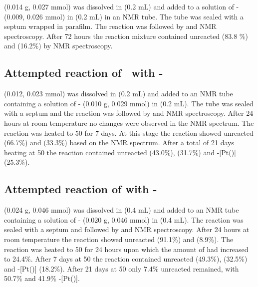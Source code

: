 \tButhixantphos{} (0.014 g, 0.027 mmol) was dissolved in  (0.2 mL) and added to a solution of \cis- (0.009, 0.026 mmol) in  (0.2 mL) in an NMR tube.  The tube was sealed with a septum wrapped in parafilm.  The reaction was followed by \proton{} and \phosphorus{} NMR spectroscopy.  After 72 hours the reaction mixture contained unreacted \tButhixantphos{} (83.8 \%) and \tButhixantphos{}  (16.2\%) by \phosphorus{} NMR spectroscopy.  

\subsection*{Attempted reaction of \tButhixantphos\ with \trans-}

\tButhixantphos{} (0.012, 0.023 mmol) was dissolved in  (0.2 mL) and added to an NMR tube containing a solution of \trans- (0.010 g, 0.029 mmol) in  (0.2 mL). The tube was sealed with a septum and the reaction was followed by \proton{} and \phosphorus{} NMR spectroscopy.  After 24 hours at room temperature no changes were observed in the NMR spectrum.  The reaction was heated to 50 \degC for 7 days.  At this stage the reaction showed unreacted \tButhixantphos{} (66.7\%) and \tButhixantphos{} (33.3\%) based on the \phosphorus{} NMR spectrum.  After a total of 21 days heating at 50 \degC the reaction contained unreacted \tButhixantphos{} (43.0\%), \tButhixantphos{} (31.7\%) and \trans-[Pt(\tButhixantphos)] (25.3\%).  

\subsection*{Attempted reaction of \tButhixantphos with \trans-\ce{[Pt(CN^{t}Bu)2Cl2]}}

\tButhixantphos{} (0.024 g, 0.046 mmol) was dissolved in  (0.4 mL) and added to an NMR tube containing a solution of \trans- (0.020 g, 0.046 mmol) in  (0.4 mL).  The reaction was sealed with a septum and followed by \proton{} and \phosphorus{} NMR spectroscopy.  After 24 hours at room temperature the reaction showed unreacted \tButhixantphos{} (91.1\%) and \tButhixantphos{} (8.9\%).  The reaction was heated to 50 \degC{} for 24 hours upon which the amount of \tButhixantphos{} had increased to 24.4\%.  After 7 days at 50 \degC the reaction contained unreacted \tButhixantphos{} (49.3\%), \tButhixantphos{} (32.5\%) and \trans-[Pt(\tButhixantphos)] (18.2\%).  After 21 days at 50 \degC only 7.4\% unreacted \tButhixantphos remained, with 50.7\% \tButhixantphos{} and 41.9\% \trans-[Pt(\tButhixantphos)].  


